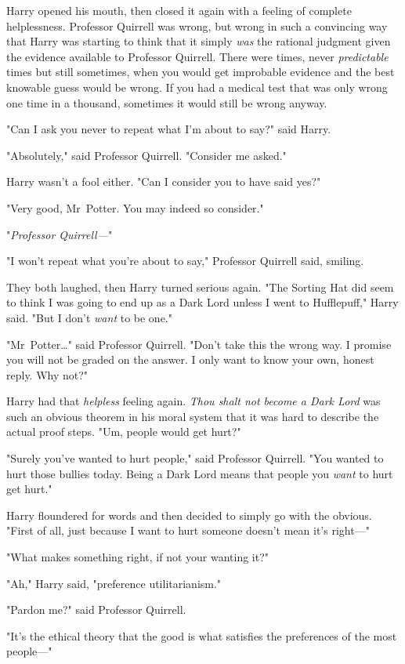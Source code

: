 Harry opened his mouth, then closed it again with a feeling of complete
helplessness. Professor Quirrell was wrong, but wrong in such a convincing way
that Harry was starting to think that it simply \emph{was} the rational
judgment given the evidence available to Professor Quirrell. There were times,
never \emph{predictable} times but still sometimes, when you would get
improbable evidence and the best knowable guess would be wrong. If you had a
medical test that was only wrong one time in a thousand, sometimes it would
still be wrong anyway.

"Can I ask you never to repeat what I'm about to say?" said Harry.

"Absolutely," said Professor Quirrell. "Consider me asked."

Harry wasn't a fool either. "Can I consider you to have said yes?"

"Very good, Mr~Potter. You may indeed so consider."

"\emph{Professor Quirrell—}"

"I won't repeat what you're about to say," Professor Quirrell said, smiling.

They both laughed, then Harry turned serious again. "The Sorting Hat did seem
to think I was going to end up as a Dark Lord unless I went to Hufflepuff,"
Harry said. "But I don't \emph{want} to be one."

"Mr~Potter…" said Professor Quirrell. "Don't take this the wrong way. I
promise you will not be graded on the answer. I only want to know your own,
honest reply. Why not?"

Harry had that \emph{helpless} feeling again. \emph{Thou shalt not become a
Dark Lord} was such an obvious theorem in his moral system that it was hard to
describe the actual proof steps. "Um, people would get hurt?"

"Surely you've wanted to hurt people," said Professor Quirrell. "You wanted to
hurt those bullies today. Being a Dark Lord means that people you \emph{want}
to hurt get hurt."

Harry floundered for words and then decided to simply go with the obvious.
"First of all, just because I want to hurt someone doesn't mean it's right—"

"What makes something right, if not your wanting it?"

"Ah," Harry said, "preference utilitarianism."

"Pardon me?" said Professor Quirrell.

"It's the ethical theory that the good is what satisfies the preferences of the
most people—"

